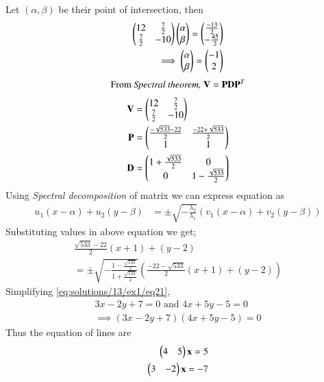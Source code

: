 Let $(\alpha,\beta)$ be their point of intersection, then
\begin{align}
	\label{eq:solutions/13/ex1/eq16}\myvec{ 12 & \frac{7}{2}\\\frac{7}{2} & -10}\myvec{\alpha \\ \beta} = \myvec{\frac{-13}{2} \\ -\frac{45}{2}} \\
	\label{eq:solutions/13/ex1/eq17}\implies \myvec{\alpha \\ \beta} = \myvec{-1 \\ 2}
\end{align}
\begin{equation}
	\text{From \textit{Spectral theorem, }}\vec{V} = \vec{P}\vec{D}\vec{P}^T
\end{equation}
\begin{align}
	\label{eq:solutions/13/ex1/eq18}\vec{V} &= \myvec{ 12 & \frac{7}{2}\\ \frac{7}{2} & -10}\\
	\label{eq:solutions/13/ex1/eq19}\vec{P} &= \myvec{\frac{-\sqrt{533} - 22}{2} & \frac{-22 + \sqrt{533}}{2}\\ 1 & 1}\\
	\label{eq:solutions/13/ex1/eq20}\vec{D} &= \myvec{1 + \frac{\sqrt{533}}{2} & 0\\ 0 & 1 - \frac{\sqrt{533}}{2}}
\end{align}
Using \textit{Spectral decomposition} of matrix we can express equation as
\begin{align}
	\label{eq:solutions/13/ex1/eq14}u_1(x-\alpha) + u_2(y-\beta) &= \pm \sqrt{-\frac{\lambda_2}{\lambda_1}}(v_1(x-\alpha) + v_2(y-\beta))
\end{align}
Substituting values in above equation we get;
\begin{multline}\label{eq:solutions/13/ex1/eq21}
	\frac{\sqrt{533}-22}{2}(x+1) + (y-2) \\= \pm \sqrt{-\frac{1 - \frac{\sqrt{533}}{2}}{1 + \frac{\sqrt{533}}{2}}}\left(\frac{-22 -\sqrt{533}}{2}(x+1) + (y-2)\right)
\end{multline}
Simplifying \eqref{eq:solutions/13/ex1/eq21},
\begin{align}
	\label{eq:solutions/13/ex1/eq22}3x -2y + 7 = 0 \text{ and } 4x + 5y -5 = 0\\
	\implies (3x - 2y + 7)(4x + 5y - 5) = 0
\end{align}
Thus the equation of lines are
\begin{align}
	\myvec{4 & 5}\vec{x} = 5 \\
	\myvec{3 & -2}\vec{x} = -7 
\end{align}
